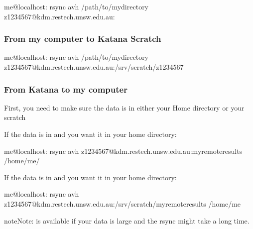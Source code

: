 \documentclass[letterpaper,10pt,english]{sphinxmanual}
\begin{document}
\begin{sphinxVerbatim}[commandchars=\\\{\}]
me@localhost:\PYGZti{}\PYGZdl{} rsync \PYGZhy{}avh /path/to/my\PYGZhy{}directory z1234567@kdm.restech.unsw.edu.au:
\end{sphinxVerbatim}


\subsubsection{From my computer to Katana Scratch}
\label{\detokenize{storage/kdm:from-my-computer-to-katana-scratch}}
\begin{sphinxVerbatim}[commandchars=\\\{\}]
me@localhost:\PYGZti{}\PYGZdl{} rsync \PYGZhy{}avh /path/to/my\PYGZhy{}directory z1234567@kdm.restech.unsw.edu.au:/srv/scratch/z1234567
\end{sphinxVerbatim}


\subsubsection{From Katana to my computer}
\label{\detokenize{storage/kdm:from-katana-to-my-computer}}
First, you need to make sure the data is in either your Home directory or your scratch

If the data is in  and you want it in your home directory:

\begin{sphinxVerbatim}[commandchars=\\\{\}]
me@localhost:\PYGZti{}\PYGZdl{} rsync \PYGZhy{}avh z1234567@kdm.restech.unsw.edu.au:my\PYGZhy{}remote\PYGZhy{}results /home/me/
\end{sphinxVerbatim}

If the data is in  and you want it in your home directory:

\begin{sphinxVerbatim}[commandchars=\\\{\}]
me@localhost:\PYGZti{}\PYGZdl{} rsync \PYGZhy{}avh z1234567@kdm.restech.unsw.edu.au:/srv/scratch/my\PYGZhy{}remote\PYGZhy{}results /home/me
\end{sphinxVerbatim}

\begin{sphinxadmonition}{note}{Note:}
{\hyperref[\detokenize{software/tmux:tmux}]{}} is available if your data is large and the rsync might take a long time.
\end{sphinxadmonition}
\end{document}
